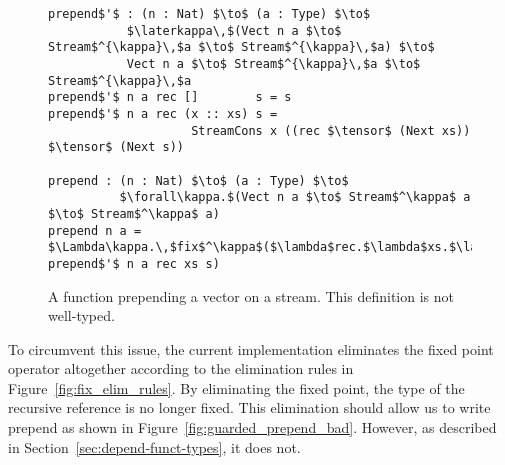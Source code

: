 \begin{figure}[h]
\begin{lstlisting}[mathescape]
prepend$'$ : (n : Nat) $\to$ (a : Type) $\to$
           $\laterkappa\,$(Vect n a $\to$ Stream$^{\kappa}\,$a $\to$ Stream$^{\kappa}\,$a) $\to$ 
           Vect n a $\to$ Stream$^{\kappa}\,$a $\to$ Stream$^{\kappa}\,$a
prepend$'$ n a rec []        s = s 
prepend$'$ n a rec (x :: xs) s = 
                    StreamCons x ((rec $\tensor$ (Next xs)) $\tensor$ (Next s))

prepend : (n : Nat) $\to$ (a : Type) $\to$ 
          $\forall\kappa.$(Vect n a $\to$ Stream$^\kappa$ a $\to$ Stream$^\kappa$ a)
prepend n a = $\Lambda\kappa.\,$fix$^\kappa$($\lambda$rec.$\lambda$xs.$\lambda$s. prepend$'$ n a rec xs s)
\end{lstlisting}
  \caption{A function prepending a vector on a stream. This definition is not well-typed.}
  \label{fig:guarded_prepend}
\end{figure}

To circumvent this issue, the current implementation eliminates the fixed point operator altogether according
to the elimination rules in Figure~\ref{fig:fix_elim_rules}. By eliminating the
fixed point, the type of the recursive reference is no longer fixed. This
elimination should allow us to write prepend as shown in
Figure~\ref{fig:guarded_prepend_bad}. However, as described in
Section~\ref{sec:depend-funct-types}, it does not.



